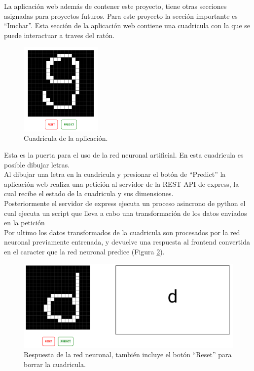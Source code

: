 \documentclass{article}
\begin{document}
La aplicación web además de contener este proyecto, tiene otras secciones asignadas para proyectos futuros. Para este proyecto la sección importante es ``Imchar''. 
Esta sección de la aplicación web contiene una cuadricula con la que se puede interactuar a traves del ratón. 
\begin{figure}[H]
    \centering
    \includegraphics[width=40mm]{grid2.png}
    \caption{Cuadricula de la aplicación.}
    \label{grid}
\end{figure}
Esta es la puerta para el uso de la red neuronal artificial. 
En esta cuadricula es posible dibujar letras.
\\ Al dibujar una letra en la cuadricula y presionar el botón de ``Predict'' la aplicación web realiza una petición al servidor de la REST API de express,
la cual recibe el estado de la cuadricula y sus dimensiones. \\
Posteriormente el servidor de express ejecuta un proceso asincrono de python el cual ejecuta un script que lleva a cabo una transformación de los datos enviados en la petición  \\
Por ultimo los datos transformados de la cuadricula son procesados por la red neuronal previamente entrenada, y devuelve una respuesta al frontend convertida en el caracter que la red neuronal predice (Figura \ref{response}).
\begin{figure}[H]
    \centering
    \includegraphics[width=180mm]{response.png}
    \caption{Respuesta de la red neuronal, también incluye el botón ``Reset'' para borrar la cuadricula.}
    \label{response}
\end{figure}
\end{document}

